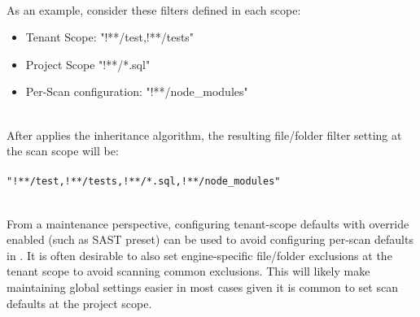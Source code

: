 \noindent\\As an example, consider these filters defined in each scope:

\begin{itemize}
    \item Tenant Scope: "!**/test,!**/tests"
    \item Project Scope "!**/*.sql"
    \item \cxoneflow Per-Scan configuration: "!**/node\_modules"
\end{itemize}

\noindent\\After \cxoneflow applies the inheritance algorithm, the resulting file/folder filter setting at the scan scope will be:
\\\\\texttt{"!**/test,!**/tests,!**/*.sql,!**/node\_modules"}


\noindent\\From a maintenance perspective, configuring tenant-scope defaults
with override enabled (such as SAST preset) can be used to avoid configuring
per-scan defaults in \cxoneflow.  It is often desirable to also set engine-specific
file/folder exclusions at the tenant scope to avoid scanning common exclusions.  
This will likely make maintaining global settings easier in most cases given
it is common to set scan defaults at the project scope.
